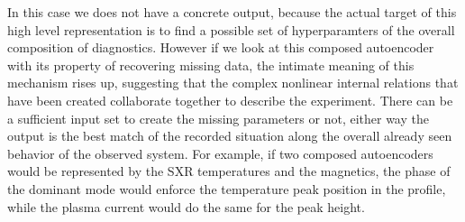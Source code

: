 In this case we does not have a concrete output, because the actual target of this high level representation is to find a possible set of hyperparamters of the overall composition of diagnostics. However if we look at this composed autoencoder with its property of recovering missing data, the intimate meaning of this mechanism rises up, suggesting that the complex nonlinear internal relations that have been created collaborate together to describe the experiment. There can be a sufficient input set to create the missing parameters or not, either way the output is the best match of the recorded situation along the overall already seen behavior of the observed system.
For example, if two composed autoencoders would be represented by the SXR temperatures and the magnetics, the phase of the dominant mode would enforce the temperature peak position in the profile, while the plasma current would do the same for the peak height.



